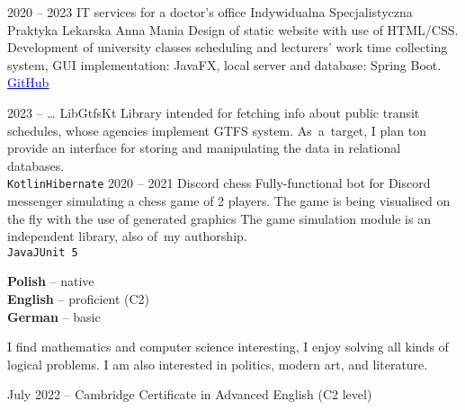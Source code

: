 \documentclass[8pt]{developercv} %
\begin{document}


\begin{entrylist}
  \entry
    {2020 -- 2023}
    {IT services for a doctor's office}
    {Indywidualna Specjalistyczna Praktyka Lekarska Anna Mania}
    {
      Design of static website with use of HTML/CSS.
      Development of university classes scheduling and lecturers' work time collecting system,
      GUI implementation: JavaFX, local server and database: Spring Boot.
      \href{https://github.com/pulkowski-jan/timetablescheduler}{
        \textcolor{blue}{\underline{GitHub}}
      }
    }
\end{entrylist}


\begin{entrylist}
  \entry
    {2023 -- \ldots}
    {LibGtfsKt}
    {}
    {
      Library intended for fetching info about public transit schedules, whose agencies implement GTFS system.
      As~a~target, I plan ton provide an interface for storing and manipulating the data in relational databases.
      \\\texttt{Kotlin}\slashsep\texttt{Hibernate}
    }
  \entry
    {2020 -- 2021}
    {Discord chess}
    {}
    {
      Fully-functional bot for Discord messenger simulating a chess game of 2 players.
      The game is being visualised on the fly with the use of generated graphics
      The game simulation module is an independent library, also of~my authorship.
      \\\texttt{Java}\slashsep\texttt{JUnit 5}
    }
\end{entrylist}



\begin{minipage}[t]{0.3\textwidth}
  \vspace{-\baselineskip}


  \textbf{Polish} -- native\\
  \textbf{English} -- proficient (C2)\\
  \textbf{German} -- basic
\end{minipage}
\hfill
\begin{minipage}[t]{0.3\textwidth}
  \vspace{-\baselineskip}

  I find mathematics and computer science interesting,
  I enjoy solving all kinds of logical problems.
  I am also interested in politics, modern art, and literature.
\end{minipage}
\hfill
\begin{minipage}[t]{0.35\textwidth}
  \vspace{-\baselineskip}

  July 2022 -- Cambridge Certificate in Advanced English (C2 level)
\end{minipage}
\end{document}
